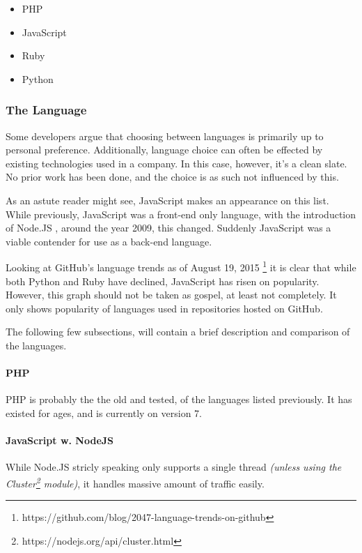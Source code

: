 			\begin{itemize}
				\item PHP
				\item JavaScript
				\item Ruby
				\item Python
			\end{itemize}

			\subsubsection{The Language}

				Some developers argue that choosing between languages is primarily up to personal preference. Additionally, language choice can often be effected by existing technologies used in a company. In this case, however, it's a clean slate. No prior work has been done, and the choice is as such not influenced by this.

				As an astute reader might see, JavaScript makes an appearance on this list. While previously, JavaScript was a front-end only language, with the introduction of Node.JS , around the year 2009, this changed. Suddenly JavaScript was a viable contender for use as a back-end language.

				Looking at GitHub's language trends as of August 19, 2015 \footnote{https://github.com/blog/2047-language-trends-on-github} it is clear that while both Python and Ruby have declined, JavaScript has risen on popularity. However, this graph should not be taken as gospel, at least not completely. It only shows popularity of languages used in repositories hosted on GitHub.

				The following few subsections, will contain a brief description and comparison of the languages.

				\paragraph{PHP}
					PHP is probably the the old and tested, of the languages listed previously. It has existed for ages, and is currently on version 7.



				\paragraph{JavaScript w. NodeJS}
					While Node.JS stricly speaking only supports a single thread \emph{(unless using the Cluster\footnote{https://nodejs.org/api/cluster.html} module)}, it handles massive amount of traffic easily.


